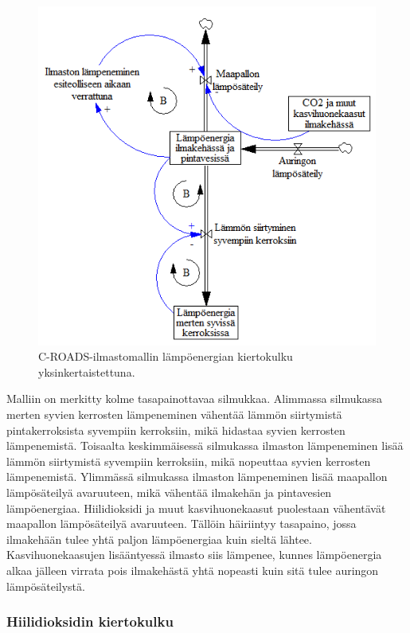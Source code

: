 \documentclass[finnish,12pt,a4paper,pdftex]{article}
\begin{document}
\begin{onehalfspacing}
\begin{figure}[ht]
\centering \includegraphics{c-roads-lampo}
\caption{C-ROADS-ilmastomallin lämpöenergian kiertokulku yksinkertaistettuna. \cite{Croads} \label{ilmasto:lampo}}
\end{figure}

Malliin on merkitty kolme tasapainottavaa silmukkaa. Alimmassa silmukassa merten syvien kerrosten lämpeneminen vähentää lämmön siirtymistä pintakerroksista syvempiin kerroksiin, mikä hidastaa syvien kerrosten lämpenemistä. Toisaalta keskimmäisessä silmukassa ilmaston lämpeneminen lisää lämmön siirtymistä syvempiin kerroksiin, mikä nopeuttaa syvien kerrosten lämpenemistä. Ylimmässä silmukassa ilmaston lämpeneminen lisää maapallon lämpösäteilyä avaruuteen, mikä vähentää ilmakehän ja pintavesien lämpöenergiaa. Hiilidioksidi ja muut kasvihuonekaasut puolestaan vähentävät maapallon lämpösäteilyä avaruuteen. Tällöin häiriintyy tasapaino, jossa ilmakehään tulee yhtä paljon lämpöenergiaa kuin sieltä lähtee. Kasvihuonekaasujen lisääntyessä ilmasto siis lämpenee, kunnes lämpöenergia alkaa jälleen virrata pois ilmakehästä yhtä nopeasti kuin sitä tulee auringon lämpösäteilystä. \cite{Croads, CroadsFlightSimulator2011} 

\subsubsection{Hiilidioksidin kiertokulku \label{ilmasto:croads:co2}}


\end{onehalfspacing}
\end{document}
